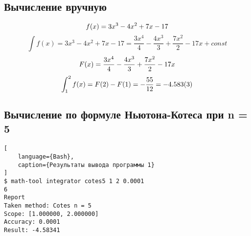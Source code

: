 \documentclass{article}
\begin{document}
\subsection{Вычисление вручную}

\begin{equation}
    f(x) = 3 x ^ 3 - 4 x ^ 2 + 7 x - 17 \\
\end{equation}
\begin{equation}
    \int f(x) = 3 x ^ 3 - 4 x ^ 2 + 7 x - 17 = \frac{3x^4}{4}-\frac{4x^3}{3} + \frac{7x^2}{2} - 17x + const
\end{equation}
\begin{equation}
    F(x) = \frac{3x^4}{4}-\frac{4x^3}{3} + \frac{7x^2}{2} - 17x  \\
\end{equation}
\begin{equation}
    \int_{1}^{2}f(x) = F(2) - F(1) = -\frac{55}{12} = -4.583(3)  \\
\end{equation}

\subsection{Вычисление по формуле Ньютона-Котеса при n = 5}

\begin{lstlisting}[
    language={Bash},
    caption={Результаты вывода программы 1}
]
$ math-tool integrator cotes5 1 2 0.0001
6
Report
Taken method: Cotes n = 5
Scope: [1.000000, 2.000000]
Accuracy: 0.0001
Result: -4.58341
\end{lstlisting}
\end{document}
